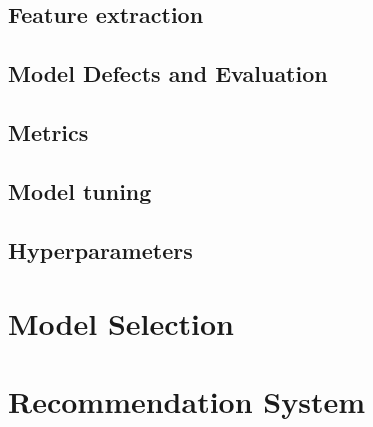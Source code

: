 \documentclass[11pt,fleqn]{book} %
\begin{document}
\chapter{Feature extraction}
\chapter{Model Defects and Evaluation}
\chapter{Metrics}
\chapter{Model tuning}
\chapter{Hyperparameters}


\part{Model Selection}




\part{Recommendation System}

\end{document}
